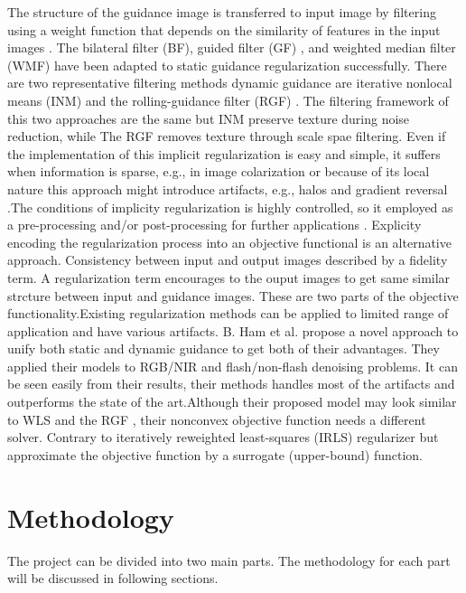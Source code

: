 \documentclass[10pt,twocolumn,letterpaper]{article}
\begin{document}
The structure of the guidance image is transferred to input image by filtering using a weight function that depends on the similarity of features in the input images \cite{Kopf:2007:JBU:1275808.1276497}. The bilateral filter (BF)\cite{tomasi1998bilateral}, guided filter (GF) \cite{he2013guided}, and weighted median filter (WMF) \cite{ma2013constant} have been adapted to static guidance regularization successfully. There are two representative filtering methods dynamic
guidance are iterative nonlocal means (INM)  \cite{brox2008efficient} and the rolling-guidance filter (RGF) \cite{ham2015robust}. The filtering framework of this two approaches are the same but INM preserve texture during noise reduction, while The RGF removes texture through scale spae filtering. Even if the implementation of this implicit regularization is easy and simple, it suffers  when information is sparse, e.g., in image colarization \cite{levin2004colorization} or because of its local nature this approach might introduce artifacts, e.g., halos and gradient reversal  \cite{he2013guided}.The conditions  of implicity regularization is highly controlled, so it employed as a pre-processing and/or post-processing for further applications \cite{lang2012practical,ma2013constant}. Explicity encoding the regularization process into an objective functional is an alternative approach. Consistency between input and output images described by a fidelity term. A regularization term encourages to the ouput images to get same similar strcture between input and guidance images. These are two parts of the objective functionality.Existing regularization methods can be applied to limited range of application and have various artifacts. B. Ham et al. propose a novel approach to unify both static and dynamic guidance to get both of their advantages. They applied their models to RGB/NIR and flash/non-flash denoising problems. It can be seen easily from their results, their methods handles most of the artifacts and outperforms the state of the art.Although their proposed model may look similar to WLS \cite{farbman2008edge} and the RGF \cite{yan2013cross}, their nonconvex objective function needs a different solver. Contrary to iteratively reweighted least-squares (IRLS) \cite{daubechies2010iteratively} regularizer but approximate the objective function by a surrogate (upper-bound) function.


\section{Methodology}
The project can be divided into two main parts. The methodology for each part will be discussed in following sections.
\end{document}
